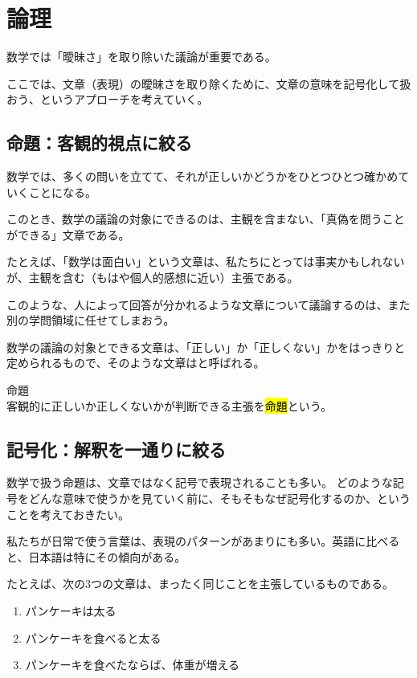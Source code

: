 \documentclass[../../imaging-math]{subfiles}
\begin{document}
\section{論理}

数学では「曖昧さ」を取り除いた議論が重要である。

ここでは、文章（表現）の曖昧さを取り除くために、文章の意味を記号化して扱おう、というアプローチを考えていく。

\subsection{命題：客観的視点に絞る}

数学では、多くの問いを立てて、それが正しいかどうかをひとつひとつ確かめていくことになる。

このとき、数学の議論の対象にできるのは、主観を含まない、「真偽を問うことができる」文章である。

\br

たとえば、「数学は面白い」という文章は、私たちにとっては事実かもしれないが、主観を含む（もはや個人的感想に近い）主張である。

このような、人によって回答が分かれるような文章について議論するのは、また別の学問領域に任せてしまおう。

\br

数学の議論の対象とできる文章は、「正しい」か「正しくない」かをはっきりと定められるもので、そのような文章はと呼ばれる。

\begin{definition}{命題}\quad\\
  客観的に正しいか正しくないかが判断できる主張を\hl{命題}という。
\end{definition}

\subsection{記号化：解釈を一通りに絞る}

数学で扱う命題は、文章ではなく記号で表現されることも多い。
どのような記号をどんな意味で使うかを見ていく前に、そもそもなぜ記号化するのか、ということを考えておきたい。

\br

私たちが日常で使う言葉は、表現のパターンがあまりにも多い。英語に比べると、日本語は特にその傾向がある。

たとえば、次の3つの文章は、まったく同じことを主張しているものである。

\begin{enumerate}
  \item パンケーキは太る
  \item パンケーキを食べると太る
  \item パンケーキを食べたならば、体重が増える
\end{enumerate}
\end{document}
